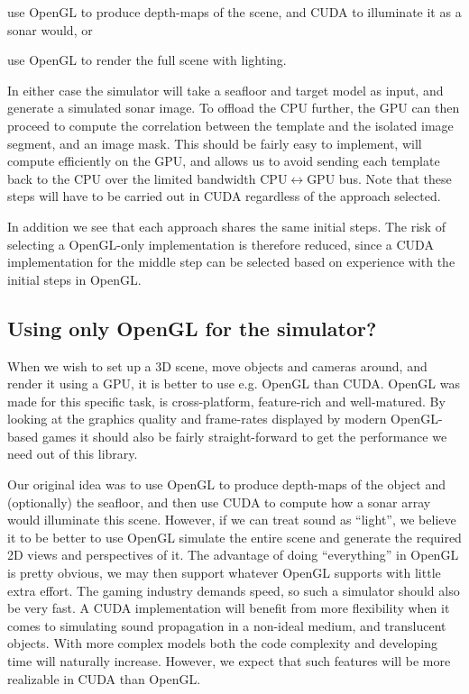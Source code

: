 \documentclass[
   article                                      %
 , 12pt                                         %
 , xelatex                                      %
 , bibtex                                       %
 , layout
]{common/mytemplate}
\begin{document}
\begin{itemize0}
\item use OpenGL to produce depth-maps of the scene, and CUDA to illuminate it as a sonar would, or
\item use OpenGL to render the full scene with lighting.
\end{itemize0}

In either case the simulator will take a seafloor and target model as input, and generate a simulated sonar image. To offload the CPU further, the GPU can then proceed to compute the correlation between the template and the isolated image segment, and an image mask. This should be fairly easy to implement, will compute efficiently on the GPU, and allows us to avoid sending each template back to the CPU over the limited bandwidth CPU$\leftrightarrow$GPU bus. Note that these steps will have to be carried out in CUDA regardless of the approach selected.

In addition we see that each approach shares the same initial steps. The risk of selecting a OpenGL-only implementation is therefore reduced, since a CUDA implementation for the middle step can be selected based on experience with the initial steps in OpenGL.    

\subsection{Using only OpenGL for the simulator?}

When we wish to set up a 3D scene, move objects and cameras around, and render it using a GPU, it is better to use e.g. OpenGL than CUDA. OpenGL was made for this specific task, is cross-platform, feature-rich and well-matured. By looking at the graphics quality and frame-rates displayed by modern OpenGL-based games it should also be fairly straight-forward to get the performance we need out of this library.

Our original idea was to use OpenGL to produce depth-maps of the object and (optionally) the seafloor, and then use CUDA to compute how a sonar array would illuminate this scene. However, if we can treat sound as ``light'', we believe it to be better to use OpenGL simulate the entire scene and generate the required 2D views and perspectives of it. The advantage of doing ``everything'' in OpenGL is pretty obvious, we may then support whatever OpenGL supports with little extra effort. The gaming industry demands speed, so such a simulator should also be very fast. A CUDA implementation will benefit from more flexibility when it comes to simulating sound propagation in a non-ideal medium, and translucent objects.  With more complex models both the code complexity and developing time will naturally increase. However, we expect that such features will be more realizable in CUDA than OpenGL.  
\end{document}
